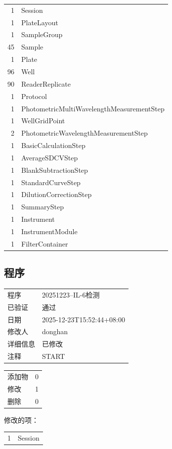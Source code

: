 \documentclass[UTF8,10pt,a4paper,fontset=fandol]{ctexart}
\begin{document}
\begin{tabular}{@{}rl@{}}
1 & Session\\
1 & PlateLayout\\
1 & SampleGroup\\
45 & Sample\\
1 & Plate\\
96 & Well\\
90 & ReaderReplicate\\
1 & Protocol\\
1 & PhotometricMultiWavelengthMeasurementStep\\
1 & WellGridPoint\\
2 & PhotometricWavelengthMeasurementStep\\
1 & BasicCalculationStep\\
1 & AverageSDCVStep\\
1 & BlankSubtractionStep\\
1 & StandardCurveStep\\
1 & DilutionCorrectionStep\\
1 & SummaryStep\\
1 & Instrument\\
1 & InstrumentModule\\
1 & FilterContainer\\
\end{tabular}

\subsection*{程序}

\begin{tabular}{@{}ll@{}}
程序 & 20251223--IL-6检测\\
已验证 & 通过\\
日期 & 2025-12-23T15:52:44+08:00\\
修改人 & donghan\\
详细信息 & 已修改\\
注释 & START\\
\end{tabular}

\medskip
\begin{tabular}{@{}ll@{}}
添加物 & 0\\
修改 & 1\\
删除 & 0\\
\end{tabular}

\medskip
修改的项：

\begin{tabular}{@{}rl@{}}
1 & Session\\
\end{tabular}
\end{document}
